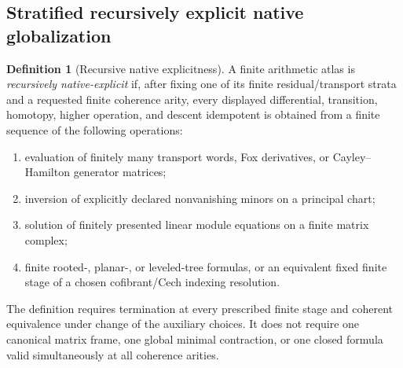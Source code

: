 \documentclass[11pt]{article}
\theoremstyle{definition}
\newtheorem{definition}[theorem]{Definition}
\begin{document}
\subsection{Stratified recursively explicit native globalization}

\begin{definition}[Recursive native explicitness]\label{def:recursive-native-explicitness}
A finite arithmetic atlas is \emph{recursively native-explicit} if, after fixing one of its finite residual/transport strata and a requested finite coherence arity, every displayed differential, transition, homotopy, higher operation, and descent idempotent is obtained from a finite sequence of the following operations:
\begin{enumerate}[label=\textnormal{(\alph*)}]
\item evaluation of finitely many transport words, Fox derivatives, or Cayley--Hamilton generator matrices;
\item inversion of explicitly declared nonvanishing minors on a principal chart;
\item solution of finitely presented linear module equations on a finite matrix complex;
\item finite rooted-, planar-, or leveled-tree formulas, or an equivalent fixed finite stage of a chosen cofibrant/Cech indexing resolution.
\end{enumerate}
The definition requires termination at every prescribed finite stage and coherent equivalence under change of the auxiliary choices.  It does not require one canonical matrix frame, one global minimal contraction, or one closed formula valid simultaneously at all coherence arities.
\end{definition}
\end{document}
